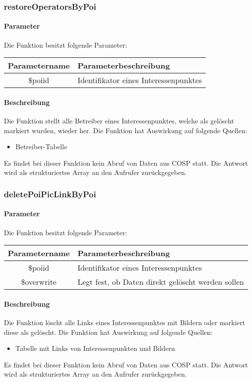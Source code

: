 \subsubsection{restoreOperatorsByPoi}
\paragraph{Parameter} Die Funktion besitzt folgende Parameter:
\begin{table}[H]
	\begin{tabular}{|c|p{11cm}|}
		\hline
		\textbf{Parametername} & \textbf{Parameterbeschreibung} \\ \hline
		\$poiid     & Identifikator eines Interessenpunktes \\ \hline
	\end{tabular}
\end{table}
\paragraph{Beschreibung} Die Funktion stellt alle Betreiber eines Interessenpunktes, welche als gelöscht markiert wurden, wieder her. Die Funktion hat Auswirkung auf folgende Quellen:
\begin{itemize}
	\item Betreiber-Tabelle
\end{itemize}
Es findet bei dieser Funktion kein Abruf von Daten aus {\glqq COSP\grqq} statt. Die Antwort wird als strukturiertes Array an den Aufrufer zurückgegeben.
\subsubsection{deletePoiPicLinkByPoi}
\paragraph{Parameter} Die Funktion besitzt folgende Parameter:
\begin{table}[H]
	\begin{tabular}{|c|p{11cm}|}
		\hline
		\textbf{Parametername} & \textbf{Parameterbeschreibung} \\ \hline
		\$poiid     & Identifikator eines Interessenpunktes \\ \hline
		\$overwrite & Legt fest, ob Daten direkt gelöscht werden sollen \\ \hline
	\end{tabular}
\end{table}
\paragraph{Beschreibung} Die Funktion löscht alle Links eines Interessenpunktes mit Bildern oder markiert diese als gelöscht. Die Funktion hat Auswirkung auf folgende Quellen:
\begin{itemize}
	\item Tabelle mit Links von Interessenpunkten und Bildern
\end{itemize}
Es findet bei dieser Funktion kein Abruf von Daten aus {\glqq COSP\grqq} statt. Die Antwort wird als strukturiertes Array an den Aufrufer zurückgegeben.
